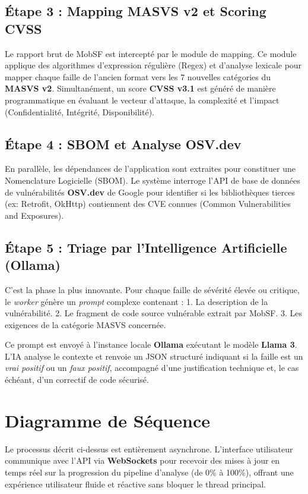 \subsection{Étape 3 : Mapping MASVS v2 et Scoring CVSS}
Le rapport brut de MobSF est intercepté par le module de mapping. Ce module applique des algorithmes d'expression régulière (Regex) et d'analyse lexicale pour mapper chaque faille de l'ancien format vers les 7 nouvelles catégories du \textbf{MASVS v2}. Simultanément, un score \textbf{CVSS v3.1} est généré de manière programmatique en évaluant le vecteur d'attaque, la complexité et l'impact (Confidentialité, Intégrité, Disponibilité).

\subsection{Étape 4 : SBOM et Analyse OSV.dev}
En parallèle, les dépendances de l'application sont extraites pour constituer une Nomenclature Logicielle (SBOM). Le système interroge l'API de base de données de vulnérabilités \textbf{OSV.dev} de Google pour identifier si les bibliothèques tierces (ex: Retrofit, OkHttp) contiennent des CVE connues (Common Vulnerabilities and Exposures).

\subsection{Étape 5 : Triage par l'Intelligence Artificielle (Ollama)}
C'est la phase la plus innovante. Pour chaque faille de sévérité élevée ou critique, le \textit{worker} génère un \textit{prompt} complexe contenant :
1. La description de la vulnérabilité.
2. Le fragment de code source vulnérable extrait par MobSF.
3. Les exigences de la catégorie MASVS concernée.

Ce prompt est envoyé à l'instance locale \textbf{Ollama} exécutant le modèle \textbf{Llama 3}. L'IA analyse le contexte et renvoie un JSON structuré indiquant si la faille est un \textit{vrai positif} ou un \textit{faux positif}, accompagné d'une justification technique et, le cas échéant, d'un correctif de code sécurisé.

\section{Diagramme de Séquence}
Le processus décrit ci-dessus est entièrement asynchrone. L'interface utilisateur communique avec l'API via \textbf{WebSockets} pour recevoir des mises à jour en temps réel sur la progression du pipeline d'analyse (de 0\% à 100\%), offrant une expérience utilisateur fluide et réactive sans bloquer le thread principal.

\cleardoublepage
